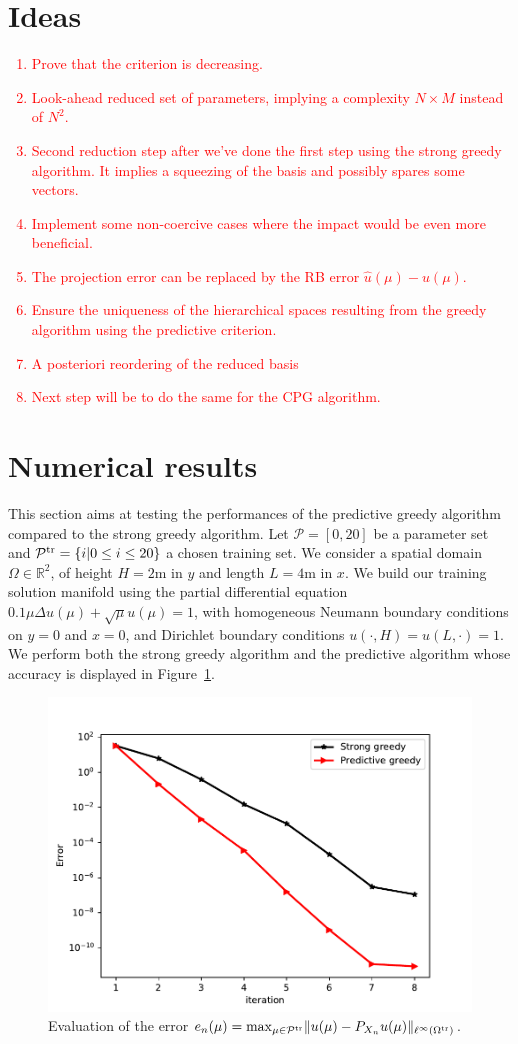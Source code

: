 \documentclass[12pt,a4paper]{article}
\newcommand\red[1]{\textcolor{red} {#1} }
\begin{document}
\section{Ideas}
\red{
\begin{enumerate}
\item Prove that the criterion is decreasing.
\item Look-ahead reduced set of parameters, implying a complexity $N\times M$ instead of $N^2$.
\item Second reduction step after we've done the first step using the strong greedy algorithm. It implies a squeezing of the basis and possibly spares some vectors.
\item Implement some non-coercive cases where the impact would be even more beneficial.
\item The projection error can be replaced by the RB error $\hat u(\mu) - u(\mu).$
\item Ensure the uniqueness of the hierarchical spaces resulting from the greedy algorithm using the predictive criterion.
\item A posteriori reordering of the reduced basis
\item Next step will be to do the same for the CPG algorithm.
\end{enumerate}
}

\section{Numerical results}
This section aims at testing the performances of the predictive greedy algorithm compared to the strong greedy algorithm.
Let $\mathcal P = [0,20]$ be a parameter set and $\mathcal P^{\rm tr}=\{i|0\leq i\leq 20\}$ a chosen training set.
We consider a spatial domain $\Omega\in\mathbb R^2$,  of height $H = 2$m in $y$ and length $L=4$m in $x$.
We build our training solution manifold using the partial differential equation $0.1\mu\Delta u(\mu)+\sqrt{\mu}u(\mu) = 1$, with homogeneous Neumann boundary conditions on $y = 0$ and $x = 0$, and Dirichlet boundary conditions $u(\cdot,H) = u(L,\cdot) = 1$. We perform both the strong greedy algorithm and the predictive algorithm whose accuracy is displayed in Figure~\ref{fig:err}.
\begin{figure}
 \centering
 \includegraphics[width=.6\textwidth]{images/error_sg_pg.pdf}
 \caption{Evaluation of the error 
 $e_n(\mu) = {\max}_{\mu\in\mathcal P^{\rm tr}}\|u(\mu)-P_{X_n}u(\mu)\|_{\ell^\infty(\Omega^{\rm tr})}$.}
 \label{fig:err}
\end{figure}
 
   
  
  
\end{document}
